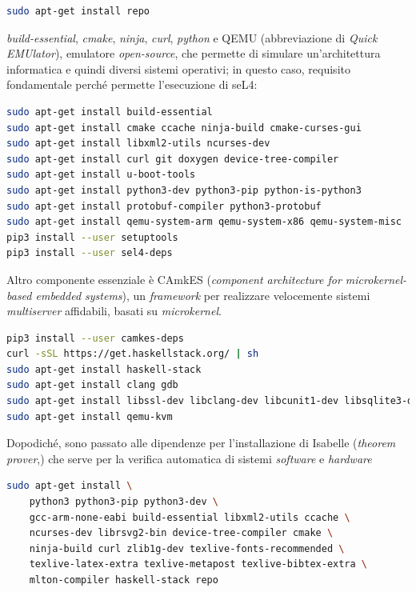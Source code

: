 \lstset{style=mystyle}

\begin{lstlisting}[language=bash]
sudo apt-get install repo
\end{lstlisting}

\textit{build-essential}, \textit{cmake}, \textit{ninja}, \textit{curl}, \textit{python} e QEMU (abbreviazione di \textit{Quick EMUlator}), emulatore \textit{open-source}, che permette di simulare un'architettura informatica e quindi diversi sistemi operativi; in questo caso, requisito fondamentale perché permette l'esecuzione di seL4:
\begin{lstlisting}[language=bash]
sudo apt-get install build-essential
sudo apt-get install cmake ccache ninja-build cmake-curses-gui
sudo apt-get install libxml2-utils ncurses-dev
sudo apt-get install curl git doxygen device-tree-compiler
sudo apt-get install u-boot-tools
sudo apt-get install python3-dev python3-pip python-is-python3
sudo apt-get install protobuf-compiler python3-protobuf
sudo apt-get install qemu-system-arm qemu-system-x86 qemu-system-misc
pip3 install --user setuptools
pip3 install --user sel4-deps
\end{lstlisting}

Altro componente essenziale è CAmkES (\textit{component architecture for \textit{microkernel}-based embedded systems}), un \textit{framework} per realizzare velocemente sistemi \textit{multiserver} affidabili, basati su \textit{microkernel}.
\begin{lstlisting}[language=bash]
pip3 install --user camkes-deps
curl -sSL https://get.haskellstack.org/ | sh
sudo apt-get install haskell-stack
sudo apt-get install clang gdb
sudo apt-get install libssl-dev libclang-dev libcunit1-dev libsqlite3-dev
sudo apt-get install qemu-kvm
\end{lstlisting}

Dopodiché, sono passato alle dipendenze per l'installazione di Isabelle (\textit{theorem prover},) che serve per la verifica automatica di sistemi \textit{software} e \textit{hardware}
\begin{lstlisting}[language=bash]
sudo apt-get install \
    python3 python3-pip python3-dev \
    gcc-arm-none-eabi build-essential libxml2-utils ccache \
    ncurses-dev librsvg2-bin device-tree-compiler cmake \
    ninja-build curl zlib1g-dev texlive-fonts-recommended \
    texlive-latex-extra texlive-metapost texlive-bibtex-extra \
    mlton-compiler haskell-stack repo
\end{lstlisting}


